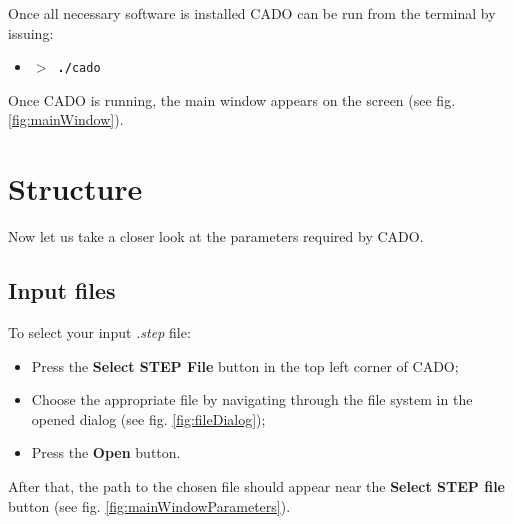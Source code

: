 \documentclass[
12pt, %
a4paper, %
oneside, %
headinclude,footinclude, %
BCOR5mm, %
]{scrartcl}
\begin{document}
Once all necessary software is installed CADO can be run from the terminal by issuing:
\begin{itemize}
\item[] \texttt{\textbf{$>$ ./}cado}
\end{itemize}

Once CADO is running, the main window appears on the screen (see fig. \ref{fig:mainWindow}).



\section{Structure}
\label{sec:structure}
Now let us take a closer look at the parameters required by CADO.

\subsection{Input files}
To select your input \textit{.step} file:
\begin{itemize}
\item Press the \textbf{Select STEP File} button in the top left corner of CADO;
\item Choose the appropriate file by navigating through the file system in the opened dialog (see fig. \ref{fig:fileDialog});
\item Press the \textbf{Open} button.
\end{itemize}

After that, the path to the chosen file should appear near the \textbf{Select STEP file} button (see fig. \ref{fig:mainWindowParameters}).
\end{document}
